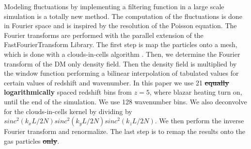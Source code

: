 \documentclass[twocolumns]{emulateapj}
\newcommand\ALc[1]{{\color{red} \bf #1}} %
\begin{document}
Modeling fluctuations by implementing a filtering function in a large scale simulation is a totally new method. The computation of the fluctuations is done in Fourier space and is inspired by the resolution of the Poisson equation. The Fourier transforms are performed with the parallel extension of the FastFourierTransform Library. The first step is map the particles onto a mesh, which is done with a clouds-in-cells algorithm \citep{1981csup.book.....H}. Then, we  determine the Fourier transform of the DM only density field. Then the density field is  multiplied by the window function performing a bilinear interpolation of tabulated values for certain values of redshift and wavenumber. In this paper we use 21 \ALc{\sout{equally} logarithmically} spaced redshift bins from $z=5$, where blazar heating turn on, until the end of the simulation. We use 128 wavenumber bins. We also deconvolve for the clouds-in-cells kernel by dividing by $sinc^2(k_xL/2N)sinc^2(k_yL/2N)sinc^2(k_zL/2N)$. We then perform the inverse Fourier transform and renormalize. The last step is to remap the results onto the gas particles \ALc{\sout{only}}.







\end{document}
